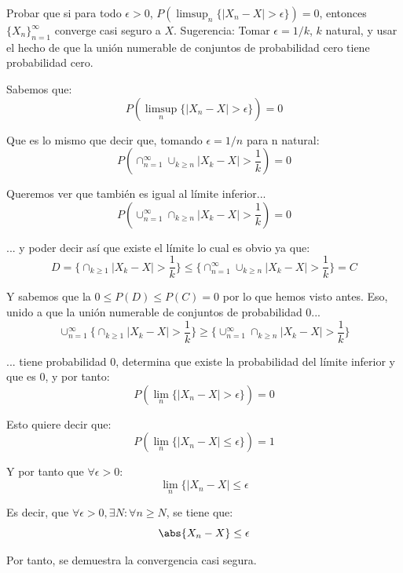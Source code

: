 \begin{problem}[9]Probar que si para todo $\epsilon > 0$,
$P(\limsup_n\{ |X_n - X| > \epsilon\}) = 0$, entonces  $\{X_n\}_{n=1}^{\infty}$  converge casi seguro a $X$.
Sugerencia: Tomar $\epsilon = 1/k$, $k$ natural, y usar el hecho de que la uni\'on numerable de conjuntos
de probabilidad cero tiene probabilidad cero.


\solution

Sabemos que:
\[
P(\limsup_n\{ |X_n - X| > \epsilon\}) = 0
\]

Que es lo mismo que decir que, tomando $\epsilon = 1/n$ para n natural:
\[
P(\cap_{n=1}^{\infty} \cup_{k\geq n} |X_k - X| > \frac{1}{k}) = 0
\]

Queremos ver que también es igual al límite inferior...
\[
P(\cup_{n=1}^{\infty} \cap_{k\geq n} |X_k - X| > \frac{1}{k}) = 0
\]

... y poder decir así que existe el límite lo cual es obvio ya que:
\[
D=\{\cap_{k\geq 1} |X_k - X| > \frac{1}{k}\} \leq \{\cap_{n=1}^{\infty} \cup_{k\geq n} |X_k - X| > \frac{1}{k}\} = C
\]

Y sabemos que la $0\leq P(D) \leq P(C)=0$ por lo que hemos visto antes. Eso, unido a que la unión numerable de conjuntos de probabilidad 0...
\[
\cup_{n=1}^{\infty} \{\cap_{k\geq 1} |X_k - X| > \frac{1}{k}\} \geq \{\cup_{n=1}^{\infty} \cap_{k\geq n} |X_k - X| > \frac{1}{k}\}
\]

... tiene probabilidad 0, determina que existe la probabilidad del límite inferior y que es 0, y por tanto:
\[
P(\lim_n\{ |X_n - X| > \epsilon\}) = 0
\]

Esto quiere decir que:
\[
P(\lim_n\{ |X_n - X| \leq \epsilon\}) = 1
\]

Y por tanto que $\forall \epsilon > 0$:
\[
\lim_n\{ |X_n - X| \leq \epsilon
\]

Es decir, que $\forall \epsilon > 0, \exists N: \forall n \geq N$, se tiene que:
\[
\abs{X_n -X} \leq \epsilon
\]

Por tanto, se demuestra la convergencia casi segura.

\end{problem}


